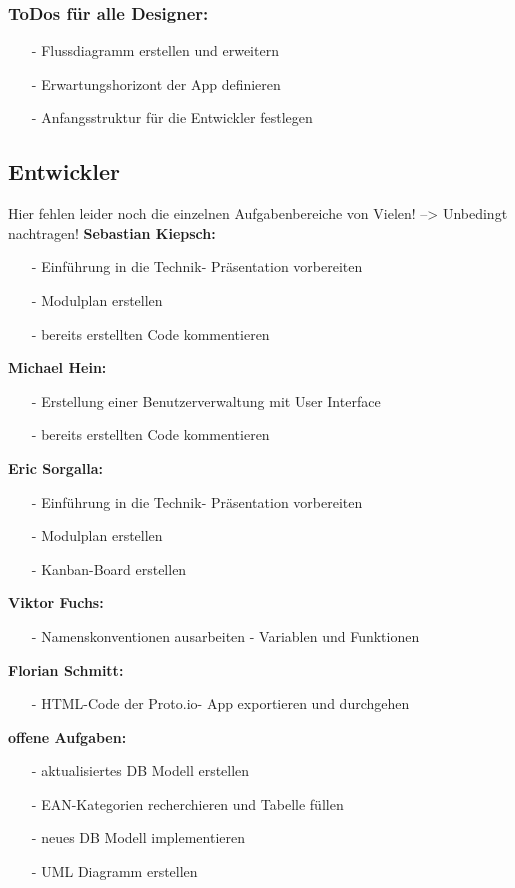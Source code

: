 \documentclass[12pt,a4paper]{article}
\begin{document}
\subsubsection*{ToDos für alle Designer:}
\begin{itemize}
\item[-]Flussdiagramm erstellen und erweitern
\item[-]Erwartungshorizont der App definieren
\item[-]Anfangsstruktur für die Entwickler festlegen
\end{itemize}
\newpage

\subsection{Entwickler}
 Hier fehlen leider noch die einzelnen Aufgabenbereiche von Vielen! --> Unbedingt nachtragen!
\newline
\newline
\textbf{Sebastian Kiepsch:}
\begin{itemize}
\item[-] Einführung in die Technik- Präsentation vorbereiten
\item[-]Modulplan erstellen
\item[-] bereits erstellten Code kommentieren
\end{itemize}
\textbf{Michael Hein:}
\begin{itemize}
\item[-]Erstellung einer Benutzerverwaltung mit User Interface
\item[-] bereits erstellten Code kommentieren
\end{itemize}
\textbf{Eric Sorgalla:}
\begin{itemize}
\item[-] Einführung in die Technik- Präsentation vorbereiten
\item[-] Modulplan erstellen
\item[-] Kanban-Board erstellen
\end{itemize}
\textbf{Viktor Fuchs:}
\begin{itemize}
\item[-] Namenskonventionen ausarbeiten - Variablen und Funktionen
\end{itemize}
\textbf{Florian Schmitt:}
\begin{itemize}
\item[-] HTML-Code der Proto.io- App exportieren und durchgehen
\end{itemize}
\textbf{offene Aufgaben:}
\begin{itemize}
\item[-] aktualisiertes DB Modell erstellen
\item[-] EAN-Kategorien recherchieren und Tabelle füllen
\item[-] neues DB Modell implementieren
\item[-] UML Diagramm erstellen
\end{itemize}
\end{document}
